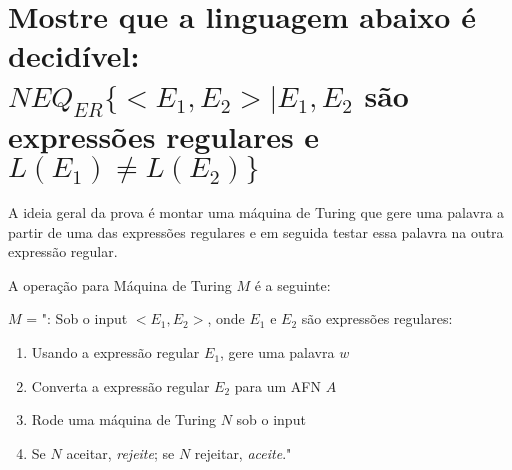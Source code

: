 \section{
    Mostre que a linguagem abaixo é decidível: \\
    \(N E Q_{ER}\{<E_1, E_2> | E_1, E_2 \) são expressões regulares e \( L(E_1) \neq L(E_2) \}\)
    }

\setlength{\parindent}{4em}
\setlength{\parskip}{0.5em}
\renewcommand{\baselinestretch}{1}

A ideia geral da prova é montar uma máquina de Turing que gere uma palavra a partir de uma das expressões regulares e em seguida testar essa palavra na outra expressão regular.

A operação para Máquina de Turing \(M\) é a seguinte:

\(M\) = ": Sob o input \(<E_1, E_2>\), onde \(E_1\) e \(E_2\) são expressões regulares:

\begin{enumerate}    
    \item Usando a expressão regular \(E_1\), gere uma palavra \(w\)

    \item Converta a expressão regular \(E_2\) para um AFN \(A\) 

    \item Rode uma máquina de Turing \(N\) sob o input \(<A, w>\)

    \item Se \(N\) aceitar, \textit{rejeite}; se \(N\) rejeitar, \textit{aceite}."
\end{enumerate}